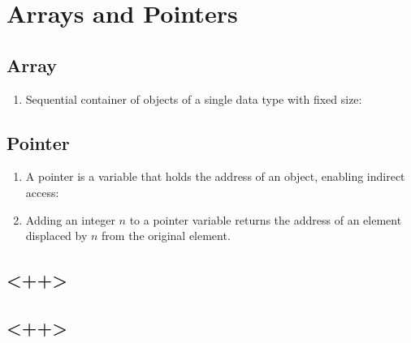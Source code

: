 \chapter{Arrays and Pointers}

\section{Array}
\begin{enumerate}
\item Sequential container of objects of a single data type with fixed size:
\end{enumerate}

\section{Pointer}
\begin{enumerate}
\item A pointer is a variable that holds the address of an object, enabling
    indirect access: 
\item Adding an integer $n$ to a pointer variable returns the address of an
    element displaced by $n$ from the original element.
\end{enumerate}

\section{<++>}

\section{<++>}

